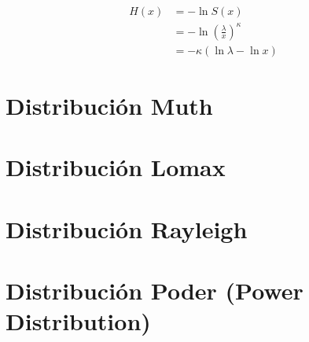 \documentclass[10pt,a4paper]{article}
\begin{document}
\begin{align*}
H(x) &= -\ln S(x) \\
     &= - \ln \left( \frac{\lambda}{x} \right) ^ \kappa \\
     &= -\kappa (\ln \lambda - \ln x)
\end{align*}

\section{Distribuci\'on Muth}

\section{Distribuci\'on Lomax}

\section{Distribuci\'on Rayleigh}

\section{Distribuci\'on Poder (Power Distribution)}
\end{document}
